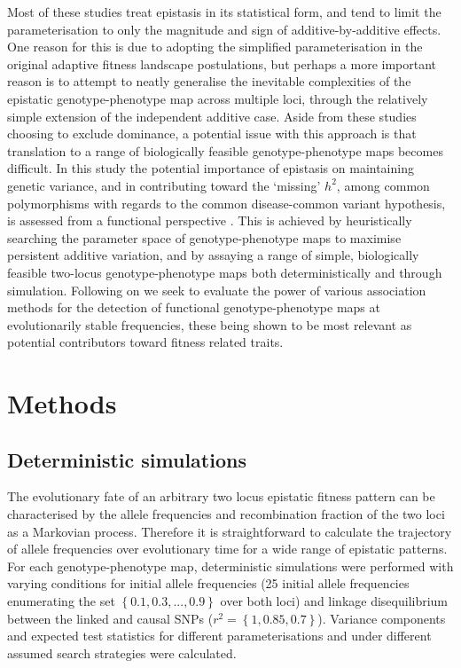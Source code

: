 Most of these studies treat epistasis in its statistical form, and tend to limit the parameterisation to only the magnitude and sign of additive-by-additive effects. One reason for this is due to adopting the simplified parameterisation in the original adaptive fitness landscape postulations, but perhaps a more important reason is to attempt to neatly generalise the inevitable complexities of the epistatic genotype-phenotype map across multiple loci, through the relatively simple extension of the independent additive case. Aside from these studies choosing to exclude dominance, a potential issue with this approach is that translation to a range of biologically feasible genotype-phenotype maps becomes difficult. In this study the potential importance of epistasis on maintaining genetic variance, and in contributing toward the `missing' $h^2$, among common polymorphisms with regards to the common disease-common variant hypothesis, is assessed from a functional perspective \citep{Cheverud1995,Alvarez-Castro2007}. This is achieved by heuristically searching the parameter space of genotype-phenotype maps to maximise persistent additive variation, and by assaying a range of simple, biologically feasible two-locus genotype-phenotype maps both deterministically and through simulation. Following on we seek to evaluate the power of various association methods for the detection of functional genotype-phenotype maps at evolutionarily stable frequencies, these being shown to be most relevant as potential contributors toward fitness related traits.



\section{Methods}


\subsection{Deterministic simulations}

The evolutionary fate of an arbitrary two locus epistatic fitness pattern can be characterised by the allele frequencies and recombination fraction of the two loci as a Markovian process. Therefore it is straightforward to calculate the trajectory of allele frequencies over evolutionary time for a wide range of epistatic patterns. For each genotype-phenotype map, deterministic simulations were performed with varying conditions for initial allele frequencies (25 initial allele frequencies enumerating the set $\left\{ 0.1, 0.3, ..., 0.9 \right\}$ over both loci) and linkage disequilibrium between the linked and causal SNPs ($r^{2} = \left\{1,0.85,0.7\right\} $). Variance components and expected test statistics for different parameterisations and under different assumed search strategies were calculated.


